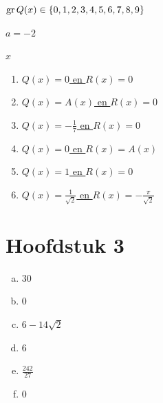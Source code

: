 \documentclass{ximera}
\begin{document}
\begin{oplossing} 
\hyperlink{oef2.17}{$\operatorname{gr} Q(x) \in \left\{0,1,2,3,4,5,6,7,8,9\right\}$}
\end{oplossing} 

\begin{oplossing} 
\hyperlink{oef2.18}{$a=-2$}
\end{oplossing} 

\begin{oplossing} 
\hyperlink{oef2.19}{$x$}
\end{oplossing} 

\begin{oplossing} 
\begin{enumerate}
\item
\hyperlink{oef2.20}{$Q(x) = 0$ en $R(x) = 0$}
\item
\hyperlink{oef2.20}{$Q(x) = A(x)$ en $R(x) = 0$}
\item
\hyperlink{oef2.20}{$Q(x) = -\frac{1}{7}$ en $R(x) = 0$}
\item
\hyperlink{oef2.20}{$Q(x) = 0$ en $R(x) = A(x)$}
\item
\hyperlink{oef2.20}{$Q(x) = 1$ en $R(x) = 0$}
\item
\hyperlink{oef2.20}{$Q(x) = \frac{1}{\sqrt{2}}$ en $R(x) =-\frac{\pi}{\sqrt{2}}$}
\end{enumerate}
\setcounter{enumi}{0}
\end{oplossing} 














\section*{Hoofdstuk 3}

\begin{oplossing} 
\begin{enumerate}[(a)]
\item
\hyperlink{oef3.1}{$30$}
\item
\hyperlink{oef3.1}{$0$}
\item
\hyperlink{oef3.1}{$6-14\sqrt{2}$}
\item
\hyperlink{oef3.1}{$6$}
\item
\hyperlink{oef3.1}{$\frac{242}{27}$}
\item
\hyperlink{oef3.1}{$0$}
\end{enumerate}
\end{oplossing} 
\end{document}
